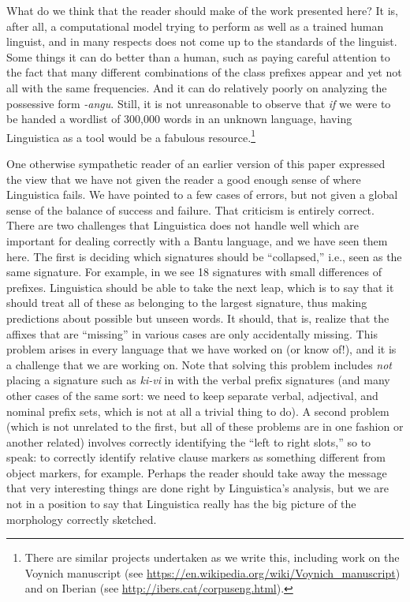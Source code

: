 \documentclass[output=paper,colorlinks,citecolor=brown]{langscibook}
\begin{document}
What do we think that the reader should make of the work presented here? It is, after all, a computational model trying to perform as well as a trained human linguist, and in many respects does not come up to the standards of the linguist. Some things it can do better than a human, such as paying careful attention to the fact that many different combinations of the class prefixes appear and yet not all with the same frequencies. And it can do relatively poorly on analyzing the possessive form \textit{-angu}. Still, it is not unreasonable to observe that \textit{if} we were to be handed a wordlist of 300,000 words in an unknown language, having Linguistica as a tool would be a fabulous resource.\footnote{There are similar projects undertaken as we write this, including work on the Voynich manuscript (see \url{https://en.wikipedia.org/wiki/Voynich\_manuscript}) and on Iberian (see \url{http://ibers.cat/corpuseng.html}).} 

One otherwise sympathetic reader of an earlier version of this paper expressed the view that we have not given the reader a good enough sense of where Linguistica fails. We have pointed to a few cases of errors, but not given a global sense of the balance of success and failure.  That criticism is entirely correct. There are two challenges that Linguistica does not handle well which are important for dealing correctly with a Bantu language, and we have seen them here. The first is deciding which signatures should be ``collapsed,'' i.e., seen as the same signature. For example, in  we see 18 signatures with small differences of prefixes. Linguistica should be able to take the next leap, which is to say that it should treat all of these as belonging to the largest signature, thus making predictions about possible but unseen words. It should, that is, realize that the affixes that are ``missing'' in various cases are only accidentally missing. This problem arises in every language that we have worked on (or know of!), and it is a challenge that we are working on. Note that solving this problem includes {\itshape not} placing a signature such as {\itshape ki-vi} in with the verbal prefix signatures (and many other cases of the same sort: we need to keep separate verbal, adjectival, and nominal prefix sets, which is not at all a trivial thing to do). A second problem (which is not unrelated to the first, but all of these problems are in one fashion or another related) involves correctly identifying the ``left to right slots,'' so to speak: to correctly identify relative clause markers as something different from object markers, for example. Perhaps the reader should take away the message that very interesting things are done right by Linguistica's analysis, but we are not in a position to say that Linguistica really has the big picture of the morphology correctly sketched. 
\end{document}
